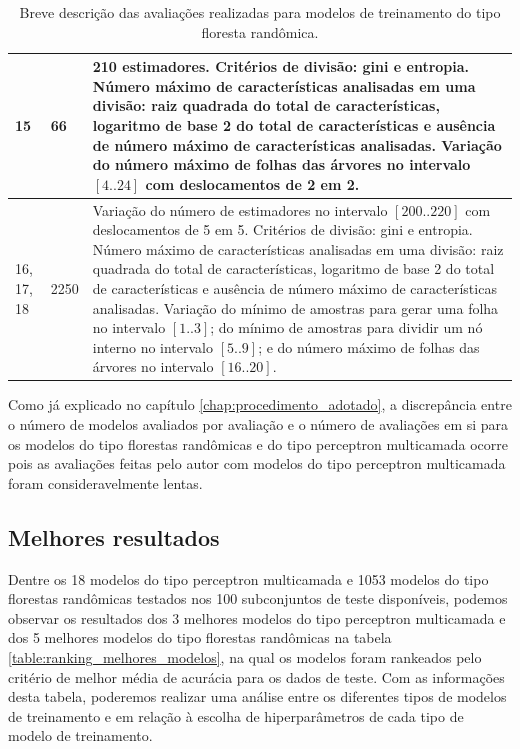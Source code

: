 \begin{table}[ht!]
\begin{center}
{\begin{tabular}{|p{1.5cm}|p{2cm}|p{12cm}|}
    \hline
    15 & 66 & 210 estimadores. Critérios de divisão: gini e entropia. Número máximo de características analisadas em uma divisão: raiz quadrada do total de características, logaritmo de base 2 do total de características e ausência de número máximo de características analisadas. Variação do número máximo de folhas das árvores no intervalo $[4 .. 24]$ com deslocamentos de 2 em 2. \\
    \hline
    16, 17, 18 & 2250 & Variação do número de estimadores no intervalo $[200 .. 220]$ com deslocamentos de 5 em 5. Critérios de divisão: gini e entropia. Número máximo de características analisadas em uma divisão: raiz quadrada do total de características, logaritmo de base 2 do total de características e ausência de número máximo de características analisadas. Variação do mínimo de amostras para gerar uma folha no intervalo $[1 .. 3]$; do mínimo de amostras para dividir um nó interno no intervalo $[5 .. 9]$; e do número máximo de folhas das árvores no intervalo $[16 .. 20]$.  \\
    \hline
    \end{tabular}
  }
  \caption{Breve descrição das avaliações realizadas para modelos de treinamento do tipo floresta randômica.}
  \label{table:descricao_avaliacoes_floresta_randomica}
  \end{center}
\end{table}

Como já explicado no capítulo \ref{chap:procedimento_adotado}, a discrepância entre o número de modelos avaliados por avaliação e o número de avaliações em si para os modelos do tipo florestas randômicas e do tipo perceptron multicamada ocorre pois as avaliações feitas pelo autor com modelos do tipo perceptron multicamada foram consideravelmente lentas.

\subsection{Melhores resultados}

Dentre os 18 modelos do tipo perceptron multicamada e 1053 modelos do tipo florestas randômicas testados nos 100 subconjuntos de teste disponíveis, podemos observar os resultados dos 3 melhores modelos do tipo perceptron multicamada e dos 5 melhores modelos do tipo florestas randômicas na tabela \ref{table:ranking_melhores_modelos}, na qual os modelos foram rankeados pelo critério de melhor média de acurácia para os dados de teste. Com as informações desta tabela, poderemos realizar uma análise entre os diferentes tipos de modelos de treinamento e em relação à escolha de hiperparâmetros de cada tipo de modelo de treinamento.

